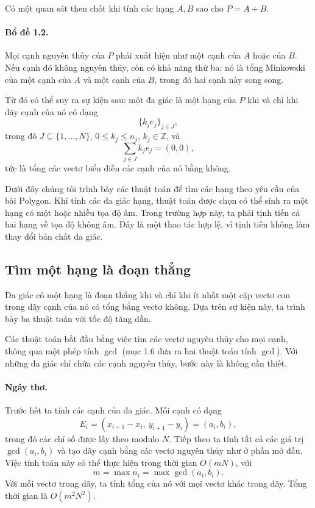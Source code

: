 \documentclass[11pt]{article}
\begin{document}
Có một quan sát then chốt khi tính các hạng \(A,B\) sao cho \(P=A+B\).

\paragraph{Bổ đề 1.2.}
Mọi cạnh nguyên thủy của \(P\) phải xuất hiện như một cạnh của \(A\) hoặc của
\(B\). Nếu cạnh đó không nguyên thủy, còn có khả năng thứ ba: nó là tổng
Minkowski của một cạnh của \(A\) và một cạnh của \(B\), trong đó hai cạnh này
song song.

Từ đó có thể suy ra sự kiện sau: một đa giác là một hạng của \(P\) khi và chỉ
khi dãy cạnh của nó có dạng
\[
  \{k_j e_j\}_{j\in J},
\]
trong đó \(J\subseteq\{1,\ldots,N\}\), \(0\le k_j\le n_j\),
\(k_j\in\mathbb Z\), và
\[
  \sum_{j\in J} k_j e_j=(0,0),
\]
tức là tổng các vectơ biểu diễn các cạnh của nó bằng không.

Dưới đây chúng tôi trình bày các thuật toán để tìm các hạng theo yêu cầu của
bài Polygon. Khi tính các đa giác hạng, thuật toán được chọn có thể sinh ra
một hạng có một hoặc nhiều tọa độ âm. Trong trường hợp này, ta phải tịnh tiến
cả hai hạng về tọa độ không âm. Đây là một thao tác hợp lệ, vì tịnh tiến không
làm thay đổi bản chất đa giác.

\subsection{Tìm một hạng là đoạn thẳng}

Đa giác có một hạng là đoạn thẳng khi và chỉ khi ít nhất một cặp vectơ con
trong dãy cạnh của nó có tổng bằng vectơ không. Dựa trên sự kiện này, ta trình
bày ba thuật toán với tốc độ tăng dần.

Các thuật toán bắt đầu bằng việc tìm các vectơ nguyên thủy cho mọi cạnh, thông
qua một phép tính \(\gcd\) (mục 1.6 đưa ra hai thuật toán tính \(\gcd\)). Với
những đa giác chỉ chứa các cạnh nguyên thủy, bước này là không cần thiết.

\paragraph{Ngây thơ.}
Trước hết ta tính các cạnh của đa giác. Mỗi cạnh có dạng
\[
  E_i=(x_{i+1}-x_i,\ y_{i+1}-y_i)=(a_i,b_i),
\]
trong đó các chỉ số được lấy theo modulo \(N\). Tiếp theo ta tính tất cả các
giá trị \(\gcd(a_i,b_i)\) và tạo dãy cạnh bằng các vectơ nguyên thủy như ở phần
mở đầu. Việc tính toán này có thể thực hiện trong thời gian \(O(mN)\), với
\[
  m=\max n_i=\max \gcd(a_i,b_i).
\]
Với mỗi vectơ trong dãy, ta tính tổng của nó với mọi vectơ khác trong dãy.
Tổng thời gian là \(O(m^2N^2)\).
\end{document}
